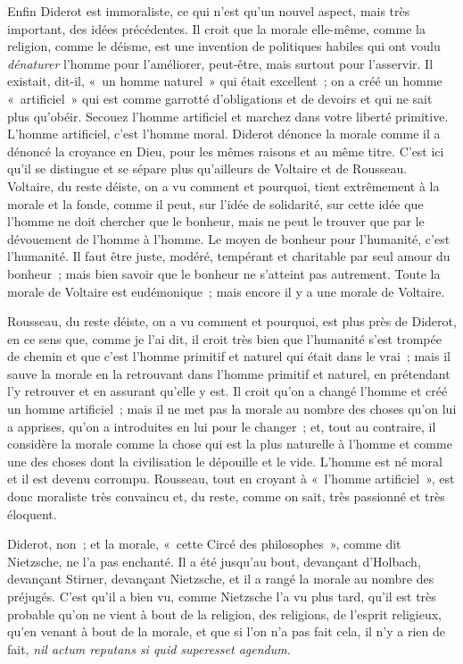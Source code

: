 \documentclass[french,twoside]{book} %
\begin{document}
Enfin Diderot est immoraliste, ce qui n’est qu’un nouvel aspect, mais très important, des idées précédentes. Il croit que la morale elle-même, comme la religion, comme le déisme, est une invention de politiques habiles qui ont voulu {\itshape dénaturer} l’homme pour l’améliorer, peut-être, mais surtout pour l’asservir. Il existait, dit-il, « un homme  naturel » qui était excellent ; on a créé un homme « artificiel » qui est comme garrotté d’obligations et de devoirs et qui ne sait plus qu’obéir. Secouez l’homme artificiel et marchez dans votre liberté primitive. L’homme artificiel, c’est l’homme moral. Diderot dénonce la morale comme il a dénoncé la croyance en Dieu, pour les mêmes raisons et au même titre. C’est ici qu’il se distingue et se sépare plus qu’ailleurs de Voltaire et de Rousseau. Voltaire, du reste déiste, on a vu comment et pourquoi, tient extrêmement à la morale et la fonde, comme il peut, sur l’idée de solidarité, sur cette idée que l’homme ne doit chercher que le bonheur, mais ne peut le trouver que par le dévouement de l’homme à l’homme. Le moyen de bonheur pour l’humanité, c’est l’humanité. Il faut être juste, modéré, tempérant et charitable par seul amour du bonheur ; mais bien savoir que le bonheur ne s’atteint pas autrement. Toute la morale de Voltaire est eudémonique ; mais encore il y a une morale de Voltaire.\par
Rousseau, du reste déiste, on a vu comment et pourquoi, est plus près de Diderot, en ce sens que, comme je l’ai dit, il croit très bien que l’humanité s’est trompée de chemin et que c’est l’homme primitif et naturel qui était dans le vrai ; mais il sauve la morale en la retrouvant dans l’homme  primitif et naturel, en prétendant l’y retrouver et en assurant qu’elle y est. Il croit qu’on a changé l’homme et créé un homme artificiel ; mais il ne met pas la morale au nombre des choses qu’on lui a apprises, qu’on a introduites en lui pour le changer ; et, tout au contraire, il considère la morale comme la chose qui est la plus naturelle à l’homme et comme une des choses dont la civilisation le dépouille et le vide. L’homme est né moral et il est devenu corrompu. Rousseau, tout en croyant à « l’homme artificiel », est donc moraliste très convaincu et, du reste, comme on sait, très passionné et très éloquent.\par
Diderot, non ; et la morale, « cette Circé des philosophes », comme dit Nietzsche, ne l’a pas enchanté. Il a été jusqu’au bout, devançant d’Holbach, devançant Stirner, devançant Nietzsche, et il a rangé la morale au nombre des préjugés. C’est qu’il a bien vu, comme Nietzsche l’a vu plus tard, qu’il est très probable qu’on ne vient à bout de la religion, des religions, de l’esprit religieux, qu’en venant à bout de la morale, et que si l’on n’a pas fait cela, il n’y a rien de fait, {\itshape nil actum reputans si quid superesset agendum}.\par
\end{document}
